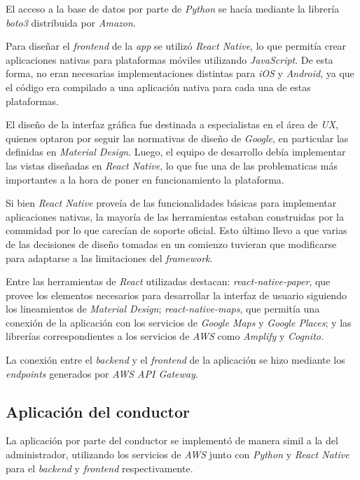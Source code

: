     El acceso a la base de datos por parte de \textit{Python} se hacía mediante la 
    librería \textit{boto3} distribuida por \textit{Amazon}.

    Para diseñar el \textit{frontend} de la \textit{app} se utilizó \textit{React Native},
    lo que permitía crear aplicaciones nativas para plataformas móviles utilizando 
    \textit{JavaScript}.
    De esta forma, no eran necesarias implementaciones distintas para \textit{iOS} y 
    \textit{Android}, ya que el código era compilado a una aplicación nativa para cada 
    una de estas plataformas.

    El diseño de la interfaz gráfica fue destinada a especialistas en el área de 
    \textit{UX}, quienes optaron por seguir las normativas de diseño de \textit{Google}, 
    en particular las definidas en \textit{Material Design}.
    Luego, el equipo de desarrollo debía implementar las vistas diseñadas en 
    \textit{React Native}, lo que fue una de las problematicas más importantes a la hora 
    de poner en funcionamiento la plataforma.

    Si bien \textit{React Native} proveía de las funcionalidades básicas para implementar 
    aplicaciones nativas, la mayoría de las herramientas estaban construidas por la 
    comunidad por lo que carecían de soporte oficial.
    Esto último llevo a que varias de las decisiones de diseño tomadas en un comienzo 
    tuvieran que modificarse para adaptarse a las limitaciones del \textit{framework}.

    Entre las herramientas de \textit{React} utilizadas destacan: 
    \textit{react-native-paper}, que provee los elementos necesarios para desarrollar la 
    interfaz de usuario siguiendo los lineamientos de \textit{Material Design}; 
    \textit{react-native-maps}, que permitía una conexión de la aplicación con los 
    servicios de \textit{Google Maps} y \textit{Google Places}; y las librerías 
    correspondientes a los servicios de \textit{AWS} como \textit{Amplify} y 
    \textit{Cognito}.


    La conexión entre el \textit{backend} y el \textit{frontend} de la aplicación se hizo
    mediante los \textit{endpoints} generados por \textit{AWS API Gateway}.

  \subsection{Aplicación del conductor}
    La aplicación por parte del conductor se implementó de manera simil a la del 
    administrador, utilizando los servicios de \textit{AWS} junto con \textit{Python} 
    y \textit{React Native} para el \textit{backend} y \textit{frontend} respectivamente.

